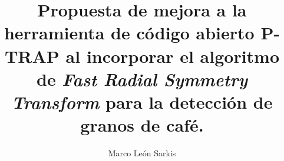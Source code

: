 \title{Propuesta de mejora a la herramienta de c\'odigo abierto P-TRAP al incorporar el algoritmo de \textit{Fast Radial Symmetry Transform} para la detecci\'on de granos de caf\'e.}
\author{Marco Le\'on Sarkis}
\maketitle
\cleardoublepage
\setcounter{savepage}{\thepage}
\begin{abstractpage}

\end{abstractpage}
